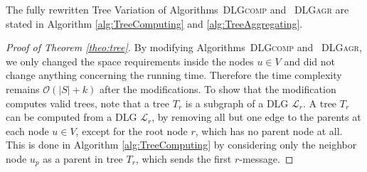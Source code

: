 \documentclass[11pt]{article}
\newcommand{\BO}{\mathcal{O}}
\newcommand{\calL}{\mathcal{L}}
\newif\iffull
\begin{document}
The fully rewritten Tree Variation of Algorithms\iffull~\ref{alg:DLGcomp}\fi~\textsc{DLGcomp} and \iffull~\ref{alg:DLGagr}\fi~\textsc{DLGagr} are stated in Algorithm \ref{alg:TreeComputing} and \ref{alg:TreeAggregating}.


\begin{proof}[Proof of Theorem \ref{theo:tree}]
By modifying Algorithms\iffull~\ref{alg:DLGcomp}\fi~\textsc{DLGcomp} and \iffull~\ref{alg:DLGagr}\fi~\textsc{DLGagr}, we only changed the space requirements inside the nodes $u\in V$ and did not change anything concerning the running time. Therefore the time complexity remains $\BO(|S|+k)$  after the modifications.
To show that the modification computes valid trees, note that a tree $T_r$ is a subgraph of a DLG $\calL_r$. A tree $T_r$ can be computed from a DLG $\calL_r$, by removing all but one edge to the parents at each node $u\in V$, except for the root node $r$, which has no parent node at all. This is done in Algorithm \ref{alg:TreeComputing} by considering only the neighbor node $u_p$ as a parent in tree $T_r$, which sends the first $r$-message.
\end{proof}
\end{document}
